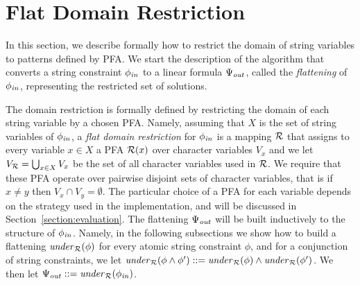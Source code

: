 \documentclass[sigplan,review,anonymous]{acmart}\settopmatter{printfolios=true,printccs=false,printacmref=false}
\begin{document}
%	
%	
%	
%
%

\section{Flat Domain Restriction}
\label{section:under_approximate}

%
In this section, we describe formally how to restrict the domain of string variables to patterns defined by PFA. 
We start the description of the algorithm that converts a string constraint $\phi_{\mathit{in}}$ to a linear formula $\Psi_{\mathit{out}}$, called the \emph{flattening} of $\phi_{\mathit{in}}$, representing the restricted set of solutions.  
%

The domain restriction is formally defined by restricting the domain of each string variable by a chosen PFA. 
%
Namely, assuming that $X$ is the set of string variables of $\phi_{\mathit{in}}$,
a \emph{flat domain restriction} for $\phi_{\mathit{in}}$ is a mapping $\mathcal{R}$ that assigns to every variable $x\in X$ a PFA $\mathcal{R}(x)$ over character variables $V_x$ and we let $V_{\mathcal{R}} = \bigcup_{x\in X} V_x$ be the set of all character variables used in $\mathcal{R}$.
We require that these PFA operate over pairwise disjoint sets of character variables, that is if $x\neq y$ then $V_x \cap V_y = \emptyset$.
%
The particular choice of a PFA 
for each variable  depends on the strategy used in the implementation, and will be discussed in Section~\ref{section:evaluation}.
%
The flattening $\Psi_{\mathit{out}}$ will be  built inductively to the structure of $\phi_{\mathit{in}}$.
Namely, in the following subsections we show how to build a flattening $\mathit{under}_{\mathcal{R}}(\phi)$ for every atomic string constraint $\phi$, 
and for a conjunction of string constraints, we let $\mathit{under}_{\mathcal{R}}(\phi \land \phi') ::= \mathit{under}_{\mathcal{R}}(\phi) \land \mathit{under}_{\mathcal{R}}(\phi')$.
We then let $\Psi_{\mathit{out}} ::= \mathit{under}_{\mathcal{R}}(\phi_{\mathit{in}})$.
\end{document}
